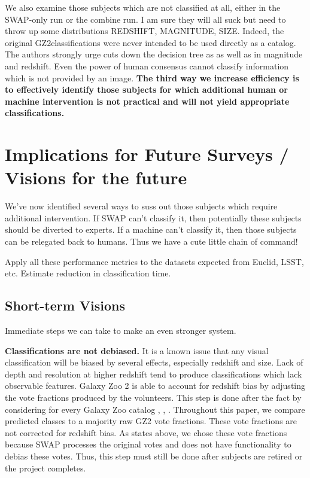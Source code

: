 \documentclass[twocolumn]{aastex6}
\begin{document}
We also examine those subjects which are not classified at all, either in the SWAP-only
run or the combine run. I am sure they will all suck but need to throw up some distributions
REDSHIFT, MAGNITUDE, SIZE.  Indeed, the original GZ2classifications were never intended 
to be used directly as a catalog. The authors strongly urge cuts down the decision tree as
as well as in magnitude and redshift. Even the power of human consensus  cannot 
classify information which is not provided by an image. \textbf{The third way we increase 
efficiency is to effectively identify those subjects for which additional human or 
machine intervention is not practical and will not yield appropriate classifications.} 




\section{Implications for Future Surveys / Visions for the future}
We've now identified several ways to suss out those subjects which require
additional intervention. If SWAP can't classify it, then potentially these subjects 
should be diverted to experts. If a machine can't classify it, then those subjects
can be relegated back to humans. Thus we have a cute little chain of command!

Apply all these performance metrics to the datasets expected from Euclid, LSST, etc. 
Estimate reduction in classification time. 

\subsection{Short-term Visions}

Immediate steps we can take to make an even stronger system. 

\textbf{Classifications are not debiased.}  
It is a known issue that any visual 
classification will be biased by several effects, especially redshift and size. 
Lack of depth and resolution at higher redshift tend to produce classifications 
which lack observable features. Galaxy Zoo 2 is able to account for redshift bias
by adjusting the vote fractions produced by the volunteers. This step is done after
the fact by considering for every Galaxy Zoo catalog
 \cite{Willett2013}, \cite{Willett2016}, \cite{Simmons2016}. 
Throughout this paper, we compare predicted classes to a majority raw GZ2 vote fractions.
These vote fractions are not corrected for redshift bias. As states above, we chose
these vote fractions because SWAP processes the original votes and does not 
have functionality to debias these votes. Thus, this step must still be done 
after subjects are retired or the project completes. 
\end{document}
